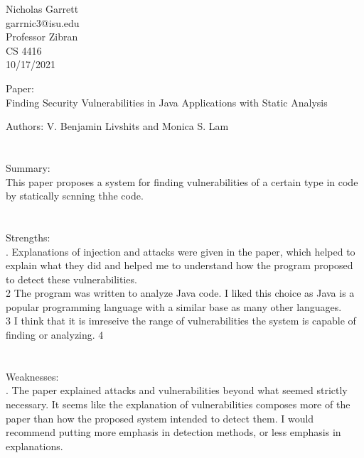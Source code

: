 \documentclass[12pt, a4paper]{article}
\begin{document}
\noindent
Nicholas Garrett\\
garrnic3@isu.edu\\ 
Professor Zibran \\
CS 4416\\
10/17/2021 \\


\begin{center}
\end{center}

\noindent
Paper:\\
	\indent
	Finding Security Vulnerabilities in Java Applications with Static Analysis

	Authors: V. Benjamin Livshits and Monica S. Lam \\ \\ \\
	
\noindent	
Summary:\\
	\indent
	This paper proposes a system for finding vulnerabilities of a certain type in code by statically scnning thhe code. \\ \\ \\

\noindent
Strengths:\\
. Explanations of injection and attacks were given in the paper, which helped to explain what they did and helped me to understand how the program proposed to detect these vulnerabilities. \\

	2   The program was written to analyze Java code.  I liked this choice as Java is a popular programming language with a similar base as many other languages. \\

	3  I think that it is imreseive the range of vulnerabilities the system is capable of finding or analyzing. 4\\ \\ \\

\noindent
Weaknesses: \\
.    The paper explained attacks and vulnerabilities beyond what seemed strictly necessary.  It seems like the explanation of vulnerabilities composes more of the paper than how the proposed system intended to detect them.  I would recommend putting more emphasis in detection methods, or less emphasis in explanations.\\
\end{document}
